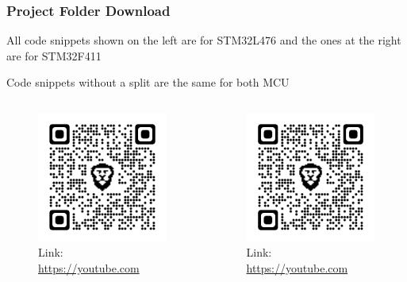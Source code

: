 \documentclass{beamer}
\begin{document}
\begin{frame}
  \frametitle{Project Folder Download}
  \alert{All code snippets shown on the left are for STM32L476 and the ones at the right are for STM32F411}

  \alert{Code snippets without a split are the same for both MCU}
  \begin{columns}[t]
    \begin{column}{.5\textwidth}
      \begin{figure}
        \includegraphics[width=.5\textwidth]{qrcode.png}
        \caption{Link: \url{https://youtube.com}}
      \end{figure}
    \end{column}
    \begin{column}{.5\textwidth}
      \begin{figure}
        \includegraphics[width=.5\textwidth]{qrcode.png}
        \caption{Link: \url{https://youtube.com}}
      \end{figure}
    \end{column}
  \end{columns}
\end{frame}
\end{document}
